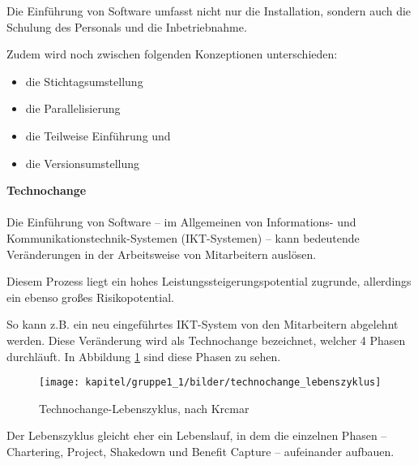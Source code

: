 Die Einführung von Software umfasst nicht nur die Installation, sondern auch die Schulung des Personals und die Inbetriebnahme.

Zudem wird noch zwischen folgenden Konzeptionen unterschieden: 
\begin{itemize}
	\item die Stichtagsumstellung
	\item die Parallelisierung
	\item die Teilweise Einführung und
	\item die Versionsumstellung
\end{itemize}
\newpage
\textbf{Technochange}\\\\
Die Einführung von Software – im Allgemeinen von Informations- und Kommunikationstechnik-Systemen (IKT-Systemen) – kann bedeutende Veränderungen in der Arbeitsweise von Mitarbeitern auslösen. 

Diesem Prozess liegt ein hohes Leistungssteigerungspotential zugrunde, allerdings ein ebenso großes Risikopotential. 

So kann z.B. ein neu eingeführtes IKT-System von den Mitarbeitern abgelehnt werden. Diese Veränderung wird als Technochange bezeichnet, welcher 4 Phasen durchläuft. In Abbildung \ref{fig_technochange_lebenszyklus} sind diese Phasen zu sehen.
\begin{figure}
	\centering
	\texttt{[image: kapitel/gruppe1\_1/bilder/technochange\_lebenszyklus]}
	\caption{Technochange-Lebenszyklus, nach Krcmar}
	\label{fig_technochange_lebenszyklus}
\end{figure}
Der Lebenszyklus gleicht eher ein Lebenslauf, in dem die einzelnen Phasen – Chartering, Project, Shakedown und Benefit Capture – aufeinander aufbauen.\\

